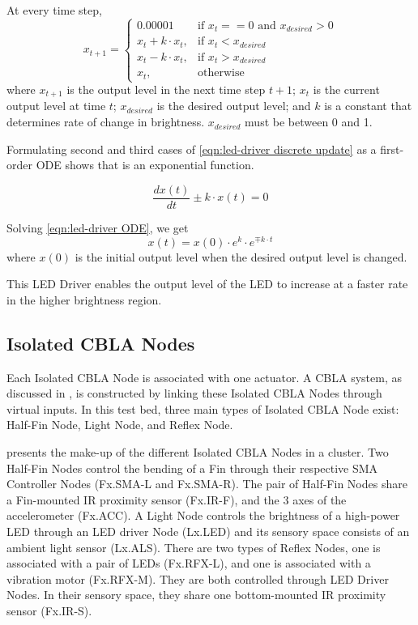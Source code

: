 At every time step, 
\begin{equation}\label{eqn:led-driver discrete update}
x_{t+1} =
\begin{cases}
0.00001 & \text{if } x_{t} == 0 \text{ and }  x_{desired} > 0 \\
x_{t} + k \cdot x_{t}, & \text{if } x_{t} < x_{desired} \\
x_{t} - k \cdot x_{t}, & \text{if } x_{t} > x_{desired} \\
x_{t}, & \text{otherwise}
\end{cases} 
\end{equation}
where $x_{t+1}$ is the output level in the next time step $t+1$; $x_t$ is the current output level at time $t$; $x_{desired}$ is the desired output level; and $k$ is a constant that determines rate of change in brightness. $x_{desired}$ must be between 0 and 1. 

Formulating second and third cases of \eqref{eqn:led-driver discrete update} as a first-order ODE shows that is an exponential function. 

\begin{equation}\label{eqn:led-driver ODE}
\frac{dx(t)}{dt} \pm k \cdot x(t)  = 0
\end{equation}

Solving \eqref{eqn:led-driver ODE}, we get 
\begin{equation}\label{eqn:led-driver ODE_solved}
x(t) = x(0) \cdot e^k \cdot e^{\mp k \cdot t}
\end{equation}
where $x(0)$ is the initial output level when the desired output level is changed.

This LED Driver enables the output level of the LED to increase at a faster rate in the higher brightness region. 

\subsection{Isolated CBLA Nodes}\label{sec:isolated-cbla-node}

Each Isolated CBLA Node is associated with one actuator. A CBLA system, as discussed in , is constructed by linking these Isolated CBLA Nodes through virtual inputs. In this test bed, three main types of Isolated CBLA Node exist: Half-Fin Node, Light Node, and Reflex Node.

 presents the make-up of the different Isolated CBLA Nodes in a cluster. Two Half-Fin Nodes control the bending of a Fin through their respective SMA Controller Nodes (Fx.SMA-L and Fx.SMA-R). The pair of Half-Fin Nodes share a Fin-mounted IR proximity sensor (Fx.IR-F), and the 3 axes of the accelerometer (Fx.ACC). A Light Node controls the brightness of a high-power LED through an LED driver Node (Lx.LED) and its sensory space consists of an ambient light sensor (Lx.ALS). There are two types of Reflex Nodes, one is associated with a pair of LEDs (Fx.RFX-L), and one is associated with a vibration motor (Fx.RFX-M). They are both controlled through LED Driver Nodes. In their sensory space, they share one bottom-mounted IR proximity sensor (Fx.IR-S). 

